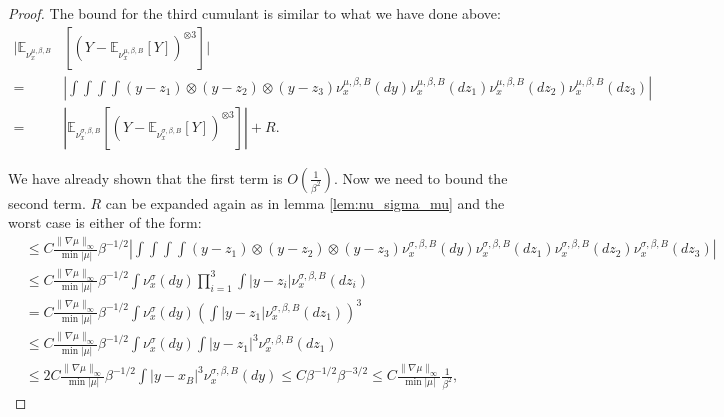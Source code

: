\documentclass{article}
\numberwithin{theorem}{section}
\begin{document}
\begin{proof}
The bound for the third cumulant is similar to what we have done above:
\begin{align*}
|\mathbb{E}_{\nu_x^{\mu, \beta, B}}&[\left(Y-\mathbb{E}_{\nu_x^{\mu, \beta, B}}[Y]\right)^{\otimes 3}]|\\
=&\left|\int \int\int\int (y-z_1)\otimes(y-z_2)\otimes(y-z_3) \nu_x^{\mu, \beta, B}(dy) \nu_x^{\mu, \beta, B}(dz_1) \nu_x^{\mu, \beta, B}(dz_2) \nu_x^{\mu, \beta, B}(dz_3)\right| \\
=&|\mathbb{E}_{\nu_x^{\sigma, \beta, B}}[\left(Y-\mathbb{E}_{\nu_x^{\sigma, \beta, B}}[Y]\right)^{\otimes 3}]|+R.
\end{align*}

We have already shown that the first term is $O(\frac{1}{\beta^2})$. Now we need to bound the second term. $R$ can be expanded again as in lemma \ref{lem:nu_sigma_mu} and the worst case is either of the form:
\begin{align*}
&\leq C\frac{\|\nabla \mu\|_\infty}{\min |\mu|}\beta^{-1/2}\left|\int\int\int\int (y-z_1)\otimes(y-z_2)\otimes(y-z_3) \nu_x^{\sigma, \beta, B}(dy) \nu_x^{\sigma, \beta, B}(dz_1) \nu_x^{\sigma, \beta, B}(dz_2) \nu_x^{\sigma, \beta, B}(dz_3)\right|\\
&\leq C\frac{\|\nabla \mu\|_\infty}{\min |\mu|}\beta^{-1/2}\int \nu_x^\sigma(dy )\prod_{i=1}^3 \int |y-z_i| \nu_x^{\sigma, \beta, B}(dz_i)\\
&= C\frac{\|\nabla \mu\|_\infty}{\min |\mu|}\beta^{-1/2}\int \nu_x^\sigma(dy )\left( \int |y-z_1| \nu_x^{\sigma, \beta, B}(dz_1)\right)^3\\
&\leq  C\frac{\|\nabla \mu\|_\infty}{\min |\mu|}\beta^{-1/2}\int \nu_x^\sigma(dy )\int |y-z_1| ^3\nu_x^{\sigma, \beta, B}(dz_1)\\
&\leq 2 C\frac{\|\nabla \mu\|_\infty}{\min |\mu|}\beta^{-1/2}\int |y-x_B|^3\nu_x^{\sigma, \beta, B}(dy)\leq C\beta^{-1/2} \beta^{-3/2}\leq C\frac{\|\nabla \mu\|_\infty}{\min |\mu|}\frac{1}{\beta^2},
\end{align*} 


\end{proof}
\end{document}
